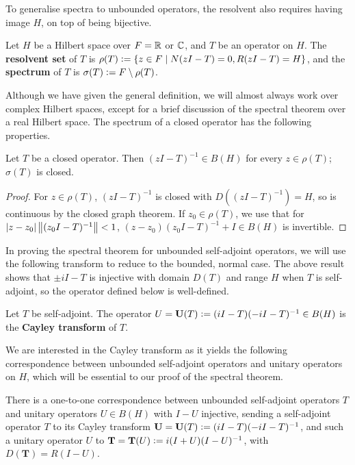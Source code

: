 \documentclass[10pt]{amsart}
\begin{document}
To generalise spectra to unbounded operators, the resolvent also requires having image $H$, on top of being bijective.
\begin{definition}
    Let $H$ be a Hilbert space over $F = \mathbb{R}$ or $\mathbb{C}$, and $T$ be an operator on $H$. The \textbf{resolvent set} of $T$ is $\rho(T) \vcentcolon= \left\{  z \in F \mid N(zI - T) = 0, R(zI - T) = H  \right\}$, and the \textbf{spectrum} of $T$ is $\sigma(T) \vcentcolon= F \setminus \rho(T)$.
\end{definition}
Although we have given the general definition, we will almost always work over complex Hilbert spaces, except for a brief discussion of the spectral theorem over a real Hilbert space. The spectrum of a closed operator has the following properties.
\begin{proposition}\label{closedprops}
    Let $T$ be a closed operator. Then $(zI - T)^{-1} \in B(H)$ for every $z \in \rho(T)$; $\sigma(T)$ is closed.
\end{proposition}
\begin{proof}
    For $z \in \rho(T)$, $(zI - T)^{-1}$ is closed with $D((zI - T)^{-1}) = H$, so is continuous by the closed graph theorem. If $z_0 \in \rho(T)$, we use that for $\left| z - z_0 \right|\left\| (z_0I - T)^{-1} \right\| < 1$, $(z - z_0)(z_0I - T)^{-1} + I \in B(H)$ is invertible.
\end{proof}
In proving the spectral theorem for unbounded self-adjoint operators, we will use the following transform to reduce to the bounded, normal case. The above result shows that $\pm iI - T$ is injective with domain $D(T)$ and range $H$ when $T$ is self-adjoint, so the operator defined below is well-defined.
\begin{definition}
    Let $T$ be self-adjoint. The operator $U = \mathbf{U}(T) \vcentcolon= (iI - T)(-iI - T)^{-1} \in B(H)$ is the \textbf{Cayley transform} of $T$.
\end{definition}
We are interested in the Cayley transform as it yields the following correspondence between unbounded self-adjoint operators and unitary operators on $H$, which will be essential to our proof of the spectral theorem.
\begin{proposition}\label{corresp}
    There is a one-to-one correspondence between unbounded self-adjoint operators $T$ and unitary operators $U \in B(H)$ with $I - U$ injective, sending a self-adjoint operator $T$ to its Cayley transform $\mathbf U = \mathbf U(T) \vcentcolon= (iI - T)(-iI - T)^{-1}$, and such a unitary operator $U$ to $\mathbf T = \mathbf T(U) \vcentcolon= i(I + U)(I - U)^{-1}$, with $D(\mathbf T) = R(I - U)$.
\end{proposition}
\end{document}

